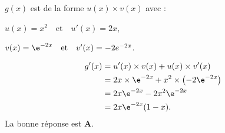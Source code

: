 \medskip

$g(x)$ est de la forme $u(x) \times v(x)$ avec :
\begin{list}{\textbullet}{}
\item $u(x) = x^2 \quad \text{et} \quad u'(x) = 2x$,
\item $v(x) = \e^{-2x} \quad \text{et} \quad v'(x) = -2e^{-2x}$.
\end{list}
\begin{align*}
g'(x) &= u'(x) \times v(x) + u(x) \times v'(x) \\
&= 2x \times \e^{-2x} + x^2 \times \left(-2\e^{-2x}\right) \\
&= 2x \e^{-2x} - 2x^2 \e^{-2x} \\
&= 2x \e^{-2x} (1 - x).
\end{align*}
La bonne réponse est \textbf{A}.

\bigskip
